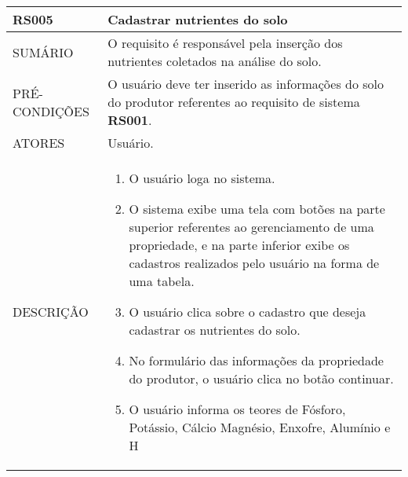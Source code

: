 \begin{longtable}[c]{@{}|p{4cm}|p{9cm}|@{}}
\hline
\begin{minipage}[t]{0.47\columnwidth}
\textbf{RS005}
\end{minipage} & \begin{minipage}[t]{0.47\columnwidth}
Cadastrar nutrientes do solo
\end{minipage}
\\\hline
\begin{minipage}[t]{0.47\columnwidth}
SUMÁRIO
\end{minipage} & \begin{minipage}[t]{0.47\columnwidth}
O requisito é responsável pela inserção dos nutrientes coletados na
análise do solo.
\end{minipage}
\\\hline
\begin{minipage}[t]{0.47\columnwidth}
PRÉ-CONDIÇÕES
\end{minipage} & \begin{minipage}[t]{0.47\columnwidth}
O usuário deve ter inserido as informações do solo do produtor
referentes ao requisito de sistema \textbf{RS001}.
\end{minipage}
\\\hline
\begin{minipage}[t]{0.47\columnwidth}
ATORES
\end{minipage} & \begin{minipage}[t]{0.47\columnwidth}
Usuário.
\end{minipage}
\\\hline
\begin{minipage}[t]{0.47\columnwidth}
DESCRIÇÃO
\end{minipage} & \begin{minipage}[t]{0.47\columnwidth}
\begin{enumerate}
\def\labelenumi{\arabic{enumi}.}
\itemsep1pt\parskip0pt\parsep0pt
\item
  O usuário loga no sistema.
\item
  O sistema exibe uma tela com botões na parte superior referentes ao
  gerenciamento de uma propriedade, e na parte inferior exibe os
  cadastros realizados pelo usuário na forma de uma tabela.
\item
  O usuário clica sobre o cadastro que deseja cadastrar os nutrientes do
  solo.
\item
  No formulário das informações da propriedade do produtor, o usuário
  clica no botão continuar.
\item
  O usuário informa os teores de Fósforo, Potássio, Cálcio Magnésio,
  Enxofre, Alumínio e H


\end{enumerate}
\end{minipage}
\end{longtable}
